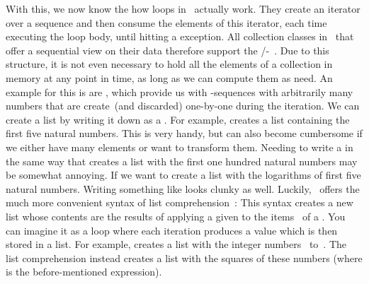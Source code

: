With this, we now know the how  loops in \python\ actually work.
They create an iterator over a sequence and then consume the elements of this iterator, each time executing the loop body, until hitting a  exception.
All collection classes in \python\ that offer a sequential view on their data therefore support the /-~\cite{PEP234}.
Due to this  structure, it is not even necessary to hold all the elements of a collection in memory at any point in time, as long as we can compute them as need.
An example for this is are , which provide us with -sequences with arbitrarily many numbers that are create~(and discarded) one-by-one during the iteration.%
%
\FloatBarrier%
\endhsection%
%
%
\label{sec:listComprehension}%
%
We can create a list by writing it down as a .
For example, \pythonil{[1, 2, 3, 4, 5]} creates a list containing the first five natural numbers.
This is very handy, but can also become cumbersome if we either have many elements or want to transform them.
Needing to write a  in the same way that creates a list with the first one hundred natural numbers may be somewhat annoying.
If we want to create a list with the logarithms of first five natural numbers.
Writing something like  looks clunky as well.
Luckily, \python\ offers the much more convenient syntax of list comprehension~\cite{PEP202}:%
%
%
\FloatBarrier%
%
%
%
%
%
%
%
This syntax creates a new list whose contents are the results of applying a given  to the items~ of a .
You can imagine it as a  loop where each iteration produces a value which is then stored in a list.
For example,  creates a list with the integer numbers~ to~.
The list comprehension  instead creates a list with the squares of these numbers (where  is the before-mentioned expression).

